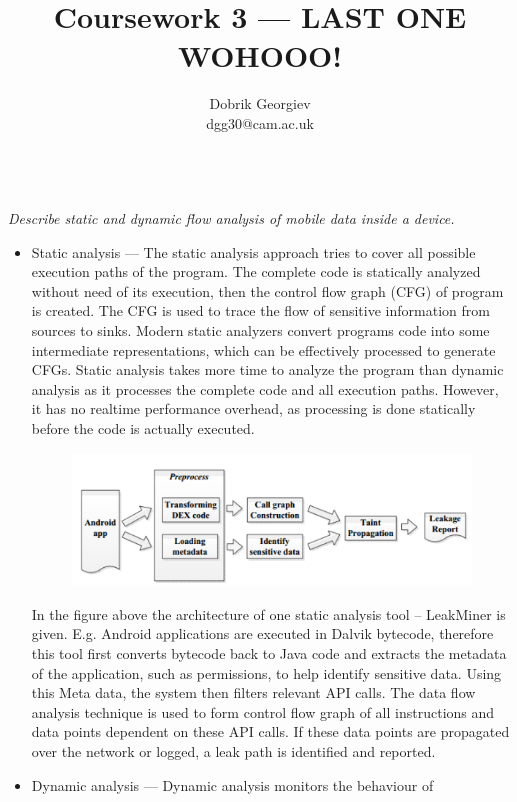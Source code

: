 \documentclass[12pt]{article}
\title{Coursework 3 --- LAST ONE WOHOOO!}
\author{Dobrik Georgiev \\ \small dgg30@cam.ac.uk}
\newcommand*\circled[1]{\tikz[baseline=(char.base)]{
		\node[shape=circle,draw,inner sep=0pt] (char) {#1};}}
\begin{document}
\maketitle
~\\
\textit{\circled{1.} Describe static and dynamic flow analysis of mobile data
inside a device.}

\begin{itemize}
    \item Static analysis --- The static analysis approach tries to cover
        all possible execution paths of the program. The complete code is
        statically analyzed without need of its execution, then
        the control flow graph (CFG) of program is created. The CFG is
        used to trace the flow of sensitive information from sources
        to sinks. Modern static analyzers convert programs code into some
        intermediate representations, which can be effectively processed to
        generate CFGs. Static analysis takes more time to analyze the program
        than dynamic analysis as it processes the complete code and all
        execution paths. However, it has no realtime performance overhead,
        as processing is done statically before the code is actually
        executed.
        \begin{figure}[H]
            \centering
            \includegraphics[width=300pt]{LeakMiner.png}
        \end{figure}
        In the figure above the architecture of one static analysis tool --
        LeakMiner is given. E.g. Android applications are executed in Dalvik
        bytecode, therefore this tool first converts  bytecode back to Java
        code and extracts the metadata of the application, such as permissions,
        to help identify sensitive data. Using this Meta data, the system then
        filters relevant API calls. The data flow analysis technique is used to
        form control flow graph of all instructions and data points dependent
        on these API calls. If these data points are propagated over the
        network or logged, a leak path is identified and reported.
    \item Dynamic analysis --- Dynamic analysis monitors the behaviour of

\end{itemize}
\end{document}
